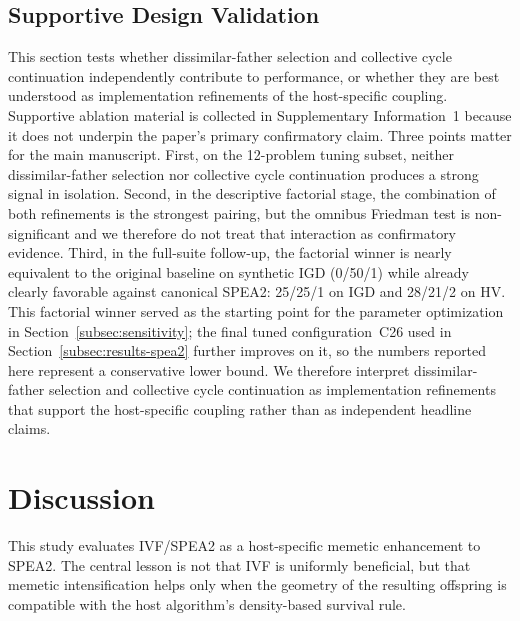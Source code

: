 \documentclass[pdflatex,sn-mathphys-ay]{sn-jnl}%
\theoremstyle{thmstyleone}%
\theoremstyle{thmstyletwo}%
\theoremstyle{thmstylethree}%
\begin{document}
\subsection{Supportive Design Validation}\label{subsec:ablation}
This section tests whether dissimilar-father selection and collective cycle continuation independently contribute to performance, or whether they are best understood as implementation refinements of the host-specific coupling. Supportive ablation material is collected in Supplementary Information~1 because it does not underpin the paper's primary confirmatory claim. Three points matter for the main manuscript. First, on the 12-problem tuning subset, neither dissimilar-father selection nor collective cycle continuation produces a strong signal in isolation. Second, in the descriptive factorial stage, the combination of both refinements is the strongest pairing, but the omnibus Friedman test is non-significant and we therefore do not treat that interaction as confirmatory evidence. Third, in the full-suite follow-up, the factorial winner is nearly equivalent to the original baseline on synthetic IGD (0/50/1) while already clearly favorable against canonical SPEA2: 25/25/1 on IGD and 28/21/2 on HV. This factorial winner served as the starting point for the parameter optimization in Section~\ref{subsec:sensitivity}; the final tuned configuration~C26 used in Section~\ref{subsec:results-spea2} further improves on it, so the numbers reported here represent a conservative lower bound. We therefore interpret dissimilar-father selection and collective cycle continuation as implementation refinements that support the host-specific coupling rather than as independent headline claims.



\section{Discussion}\label{sec:discussion}

This study evaluates IVF/SPEA2 as a host-specific memetic enhancement to SPEA2. The central lesson is not that IVF is uniformly beneficial, but that memetic intensification helps only when the geometry of the resulting offspring is compatible with the host algorithm's density-based survival rule.
\end{document}
